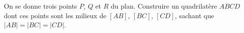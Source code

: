 On se donne trois points $P$, $Q$ et $R$ du plan. Construire un quadrilatère $ABCD$ dont ces points sont les milieux de $[AB]$, $[BC]$, $[CD]$, sachant que $|AB| = |BC| = |CD|$.
